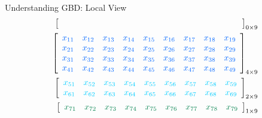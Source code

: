 \begin{frame}[shrink]
\begin{exampleblock}{Understanding GBD:  Local View}
\begin{align*}
\left[\begin{array}{lllllllll}
      &&&&&&&&\hspace{4.55cm} 
\end{array}\right]_{0\times 9}
\\
\left[\begin{array}{lllllllll}
      \color{g12}x_{11} & \color{g12}x_{12} & \color{g12}x_{13} & \color{g12}x_{14} & 
\color{g12}x_{15} & \color{g12}x_{16} & \color{g12}x_{17} & \color{g12}x_{18} & \color{g12}x_{19}\\
      \color{g12}x_{21} & \color{g12}x_{22} & \color{g12}x_{23} & \color{g12}x_{24} & 
\color{g12}x_{25} & \color{g12}x_{26} & \color{g12}x_{27} & \color{g12}x_{28} & \color{g12}x_{29}\\
      \color{g12}x_{31} & \color{g12}x_{32} & \color{g12}x_{33} & \color{g12}x_{34} & 
\color{g12}x_{35} & \color{g12}x_{36} & \color{g12}x_{37} & \color{g12}x_{38} & \color{g12}x_{39}\\
      \color{g12}x_{41} & \color{g12}x_{42} & \color{g12}x_{43} & \color{g12}x_{44} & 
\color{g12}x_{45} & \color{g12}x_{46} & \color{g12}x_{47} & \color{g12}x_{48} & \color{g12}x_{49}\\
\end{array}\right]_{4\times 9}
\\
\left[\begin{array}{lllllllll}
      \color{g13}x_{51} & \color{g13}x_{52} & \color{g13}x_{53} & \color{g13}x_{54} & 
\color{g13}x_{55} & \color{g13}x_{56} & \color{g13}x_{57} & \color{g13}x_{58} & \color{g13}x_{59}\\
      \color{g13}x_{61} & \color{g13}x_{62} & \color{g13}x_{63} & \color{g13}x_{64} & 
\color{g13}x_{65} & \color{g13}x_{66} & \color{g13}x_{67} & \color{g13}x_{68} & \color{g13}x_{69}\\
\end{array}\right]_{2\times 9}
\\
\left[\begin{array}{lllllllll}
      \color{g21}x_{71} & \color{g21}x_{72} & \color{g21}x_{73} & \color{g21}x_{74} & 
\color{g21}x_{75} & \color{g21}x_{76} & \color{g21}x_{77} & \color{g21}x_{78} & \color{g21}x_{79}
\end{array}\right]_{1\times 9}
\\

\end{align*}
\end{exampleblock}
\end{frame}
